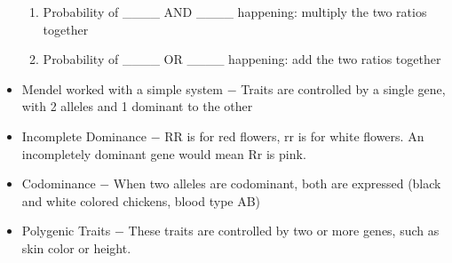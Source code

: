 \documentclass[12pt]{article}
\begin{document}
\begin{itemize}
\begin{enumerate}
      \item Probability of \_\_\_\_ AND \_\_\_\_ happening: multiply the two ratios together

      \item Probability of \_\_\_\_ OR \_\_\_\_ happening: add the two ratios together

    \end{enumerate}

  \item Mendel worked with a simple system $-$ Traits are controlled by a single gene, with 2 alleles and 1 dominant to the other

  \item Incomplete Dominance $-$ RR is for red flowers, rr is for white flowers. An incompletely dominant gene would mean Rr is pink.

  \item Codominance $-$ When two alleles are codominant, both are expressed (black and white colored chickens, blood type AB)

  \item Polygenic Traits $-$ These traits are controlled by two or more genes, such as skin color or height. 

\end{itemize}
\end{document}
